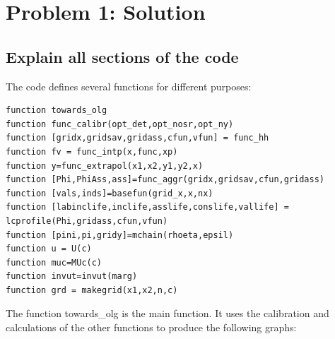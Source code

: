 \documentclass[12pt,a4paper]{article}
\begin{document}
\newpage


\section*{Problem 1: Solution}

\subsection*{Explain all sections of the code}

The code defines several functions for different purposes: 

\begin{lstlisting}[basicstyle=\tiny, frame=single]
function towards_olg
function func_calibr(opt_det,opt_nosr,opt_ny)
function [gridx,gridsav,gridass,cfun,vfun] = func_hh
function fv = func_intp(x,func,xp)
function y=func_extrapol(x1,x2,y1,y2,x)
function [Phi,PhiAss,ass]=func_aggr(gridx,gridsav,cfun,gridass)
function [vals,inds]=basefun(grid_x,x,nx)
function [labinclife,inclife,asslife,conslife,vallife] = lcprofile(Phi,gridass,cfun,vfun)
function [pini,pi,gridy]=mchain(rhoeta,epsil)
function u = U(c)
function muc=MUc(c)
function invut=invut(marg)
function grd = makegrid(x1,x2,n,c)
\end{lstlisting}

The function towards\_olg is the main function. It uses the calibration and calculations of the other functions to produce the following graphs:
\end{document}
